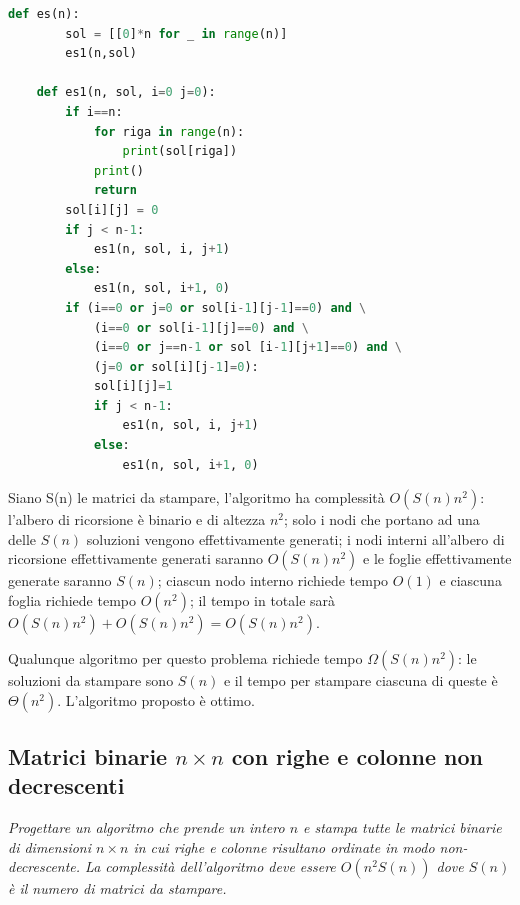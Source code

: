 \begin{lstlisting}[language=Python]
    def es(n):
        sol = [[0]*n for _ in range(n)]
        es1(n,sol)

    def es1(n, sol, i=0 j=0):
        if i==n:
            for riga in range(n):
                print(sol[riga])
            print()
            return
        sol[i][j] = 0
        if j < n-1:
            es1(n, sol, i, j+1)
        else: 
            es1(n, sol, i+1, 0)
        if (i==0 or j=0 or sol[i-1][j-1]==0) and \
            (i==0 or sol[i-1][j]==0) and \
            (i==0 or j==n-1 or sol [i-1][j+1]==0) and \
            (j=0 or sol[i][j-1]=0):
            sol[i][j]=1
            if j < n-1:
                es1(n, sol, i, j+1)
            else:
                es1(n, sol, i+1, 0)
\end{lstlisting}

Siano S(n) le matrici da stampare, l'algoritmo ha complessità $O(S(n) n^2)$: l'albero di ricorsione è binario e di altezza $n^2$; solo i nodi che portano ad una delle $S(n)$ soluzioni vengono effettivamente generati; i nodi interni all'albero di ricorsione effettivamente generati saranno $O(S(n) n^2)$ e le foglie effettivamente generate saranno $S(n)$; ciascun nodo interno richiede tempo $O(1)$ e ciascuna foglia richiede tempo $O(n^2)$; il tempo in totale sarà $O(S(n) n^2)+O(S(n)n^2)=O(S(n) n^2)$.

Qualunque algoritmo per questo problema richiede tempo $\Omega(S(n)n^2)$: le soluzioni da stampare sono $S(n)$ e il tempo per stampare ciascuna di queste è $\Theta(n^2)$. L'algoritmo proposto è ottimo.

\subsection{Matrici binarie $n\times n$ con righe e colonne non decrescenti}
\textit{Progettare un algoritmo che prende un intero $n$ e stampa tutte le matrici binarie di dimensioni $n\times n$ in cui righe e colonne risultano ordinate in modo non-decrescente. La complessità dell'algoritmo deve essere $O(n^2S(n))$ dove $S(n)$ è il numero di matrici da stampare.}

